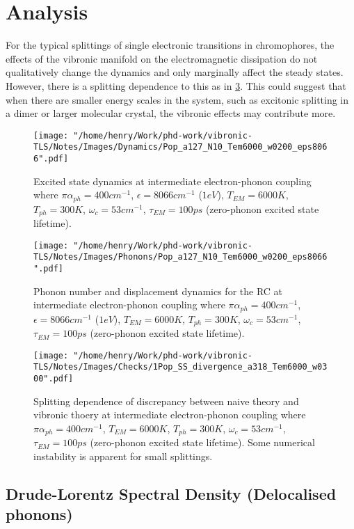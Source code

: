 \documentclass[]{article}
\begin{document}
\section{Analysis}
For the typical splittings of single electronic transitions in chromophores, the effects of the vibronic manifold on the electromagnetic dissipation do not qualitatively change the dynamics and only marginally affect the steady states. However, there is a splitting dependence to this as in \ref{fig:steadystateSplittingDependence}. This could suggest that when there are smaller energy scales in the system, such as excitonic splitting in a dimer or larger molecular crystal, the vibronic effects may contribute more.

\begin{figure}
	\texttt{[image: "/home/henry/Work/phd-work/vibronic-TLS/Notes/Images/Dynamics/Pop\_a127\_N10\_Tem6000\_w0200\_eps8066".pdf]}
	\caption{Excited state dynamics at intermediate electron-phonon coupling where $\pi\alpha_{ph}=400cm^{-1}$, $\epsilon=8066cm^{-1}$ ($1eV$), $T_{EM}=6000K$, $T_{ph}=300K$, $\omega_c=53cm^{-1}$, $\tau_{EM}=100ps$ (zero-phonon excited state lifetime).}
	\label{fig:}
\end{figure}
\begin{figure}
	\texttt{[image: "/home/henry/Work/phd-work/vibronic-TLS/Notes/Images/Phonons/Pop\_a127\_N10\_Tem6000\_w0200\_eps8066".pdf]}
	\caption{Phonon number and displacement dynamics for the RC at intermediate electron-phonon coupling where $\pi\alpha_{ph}=400cm^{-1}$, $\epsilon=8066cm^{-1}$ ($1eV$), $T_{EM}=6000K$, $T_{ph}=300K$, $\omega_c=53cm^{-1}$, $\tau_{EM}=100ps$ (zero-phonon excited state lifetime).}
	\label{fig:}
\end{figure}
\begin{figure}
	\texttt{[image: "/home/henry/Work/phd-work/vibronic-TLS/Notes/Images/Checks/1Pop\_SS\_divergence\_a318\_Tem6000\_w0300".pdf]}
	\caption{Splitting dependence of discrepancy between naive theory and vibronic thoery at intermediate electron-phonon coupling where $\pi\alpha_{ph}=400cm^{-1}$, $T_{EM}=6000K$, $T_{ph}=300K$, $\omega_c=53cm^{-1}$, $\tau_{EM}=100ps$ (zero-phonon excited state lifetime). Some numerical instability is apparent for small splittings.}
	\label{fig:steadystateSplittingDependence} 
\end{figure}

\subsection{Drude-Lorentz Spectral Density (Delocalised phonons)}
\end{document}
